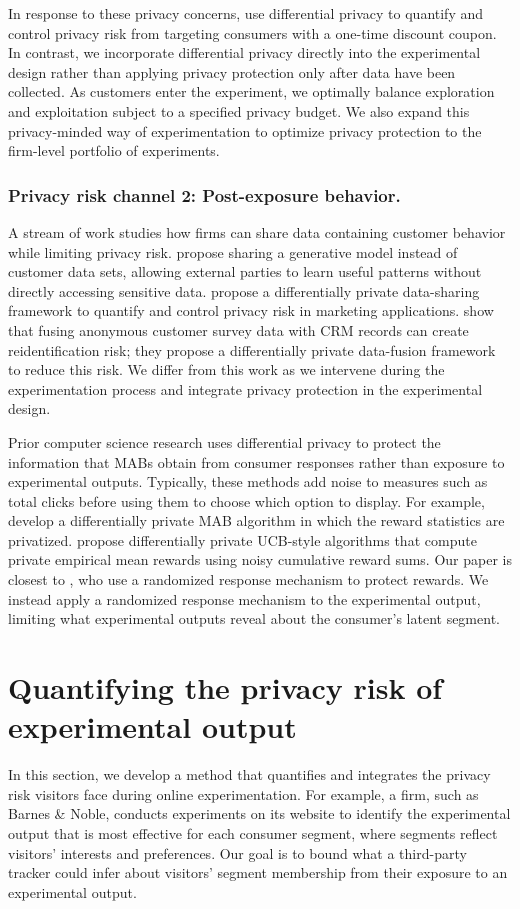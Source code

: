 \documentclass[mksc,nonblindrev]{informs3}
\begin{document}
In response to these privacy concerns, \citet{Ponte2025ActOfTargeting} use differential privacy to quantify and control privacy risk from targeting consumers with a one-time discount coupon. In contrast, we incorporate differential privacy directly into the experimental design rather than applying privacy protection only after data have been collected. As customers enter the experiment, we optimally balance exploration and exploitation subject to a specified privacy budget. We also expand this privacy-minded way of experimentation to optimize privacy protection to the firm-level portfolio of experiments.

\subsubsection{Privacy risk channel 2: Post-exposure behavior.}
A stream of work studies how firms can share data containing customer behavior while limiting privacy risk. \citet{anand_2023} propose sharing a generative model instead of customer data sets, allowing external parties to learn useful patterns without directly accessing sensitive data. \citet{PONTE2024} propose a differentially private data-sharing framework to quantify and control privacy risk in marketing applications. \citet{Tian2024} show that fusing anonymous customer survey data with CRM records can create reidentification risk; they propose a differentially private data-fusion framework to reduce this risk. We differ from this work as we intervene during the experimentation process and integrate privacy protection in the experimental design.

Prior computer science research uses differential privacy to protect the information that MABs obtain from consumer responses rather than exposure to experimental outputs. Typically, these methods add noise to measures such as total clicks before using them to choose which option to display. For example, \citet{Mishra_2015} develop a differentially private MAB algorithm in which the reward statistics are privatized. \citet{tossou_2015} propose differentially private UCB-style algorithms that compute private empirical mean rewards using noisy cumulative reward sums. Our paper is closest to \citet{ren2020}, who use a randomized response mechanism to protect rewards. We instead apply a randomized response mechanism to the experimental output, limiting what experimental outputs reveal about the consumer’s latent segment. 

\section{Quantifying the privacy risk of experimental output}\label{sec:privacy_risk}
In this section, we develop a method that quantifies and integrates the privacy risk visitors face during online experimentation. For example, a firm, such as Barnes \& Noble, conducts experiments on its website to identify the experimental output that is most effective for each consumer segment, where segments reflect visitors’ interests and preferences. Our goal is to bound what a third-party tracker could infer about visitors' segment membership from their exposure to an experimental output. 
\end{document}

